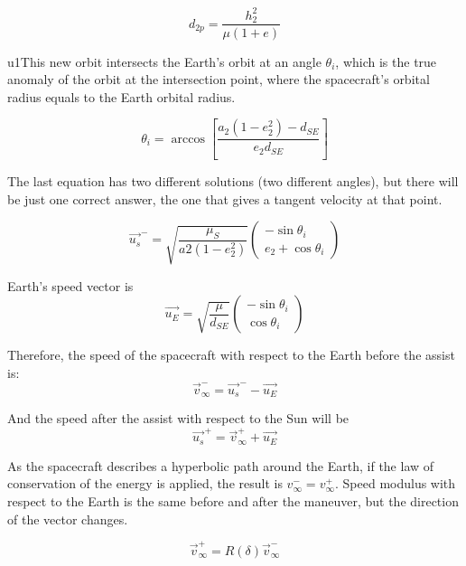 \begin{equation*}
d_{2p} = \frac{h_2^2}{\mu(1 + e)}
\end{equation*}

u1This new orbit intersects the Earth's orbit at an angle $\theta_i$, which is the true anomaly of the orbit at the intersection point, where the spacecraft's orbital radius equals to the Earth orbital radius.

\begin{equation}
\theta_i = \arccos\left[\frac{a_2(1-e_2^2)- d_{SE}}{e_2d_{SE}}\right]
\end{equation}

The last equation has two different solutions (two different angles), but there will be just one correct answer, the one that gives a tangent velocity at that point. 

\begin{equation}
\vec{u_s}^- = \sqrt{\frac{\mu_S}{a2(1 - e_2^2)}}
\left(
\begin{array}{c}
-\sin\theta_i\\
e_2 + \cos\theta_i
\end{array}
\right)
\end{equation}

Earth's speed vector is
\begin{equation*}
\vec{u_E} = \sqrt{\frac{\mu}{d_{SE}}}
\left(
\begin{array}{c}
-\sin\theta_i\\
\cos\theta_i
\end{array}
\right)
\end{equation*}

Therefore, the speed of the spacecraft with respect to the Earth before the assist is:
\begin{equation*}
\vec{v}^-_\infty = \vec{u_s}^- - \vec{u_E}
\end{equation*}

And the speed after the assist with respect to the Sun will be
\begin{equation}\label{eq:uplus}
\vec{u_s}^+ = \vec{v}^+_\infty + \vec{u_E}
\end{equation}

As the spacecraft describes a hyperbolic path around the Earth, if the law of conservation of the energy is applied, the result is $v_\infty^- = v_\infty^+$. Speed modulus with respect to the Earth is the same before and after the maneuver, but the direction of the vector changes.

\begin{equation}
\vec{v}^+_\infty = R(\delta)\vec{v}^-_\infty
\end{equation}

